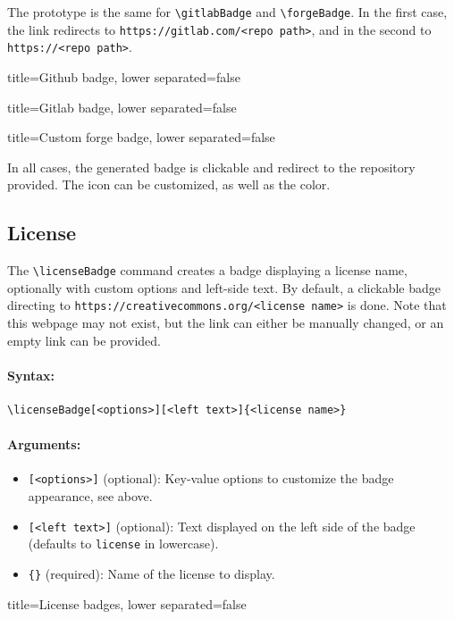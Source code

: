 The prototype is the same for \texttt{\textbackslash gitlabBadge} and \texttt{\textbackslash forgeBadge}.
In the first case, the link redirects to \texttt{https://gitlab.com/<repo path>},
and in the second to \texttt{https://<repo path>}.


\begin{tcblisting}{title={Github badge}, lower separated=false}
\end{tcblisting}

\begin{tcblisting}{title={Gitlab badge}, lower separated=false}
\end{tcblisting}

\begin{tcblisting}{title={Custom forge badge}, lower separated=false}
\end{tcblisting}

In all cases, the generated badge is clickable and redirect to the repository provided.
The icon can be customized, as well as the color.

\subsection{License}


The \texttt{\textbackslash licenseBadge} command creates a badge displaying a license name, optionally with custom options and left-side text.
By default, a clickable badge directing to \texttt{https://creativecommons.org/<license name>} is done.
Note that this webpage may not exist, but the link can either be manually changed, or an empty link can be provided.

\paragraph{Syntax:}
\begin{verbatim}
\licenseBadge[<options>][<left text>]{<license name>}
\end{verbatim}

\paragraph{Arguments:}
\begin{itemize}
    \item \texttt{[<options>]} (optional): Key-value options to customize the badge appearance, see above.
    \item \texttt{[<left text>]} (optional): Text displayed on the left side of the badge (defaults to \texttt{license} in lowercase).
    \item \texttt{\{<license name>\}} (required): Name of the license to display.
\end{itemize}


\begin{tcblisting}{title={License badges}, lower separated=false}
\end{tcblisting}

